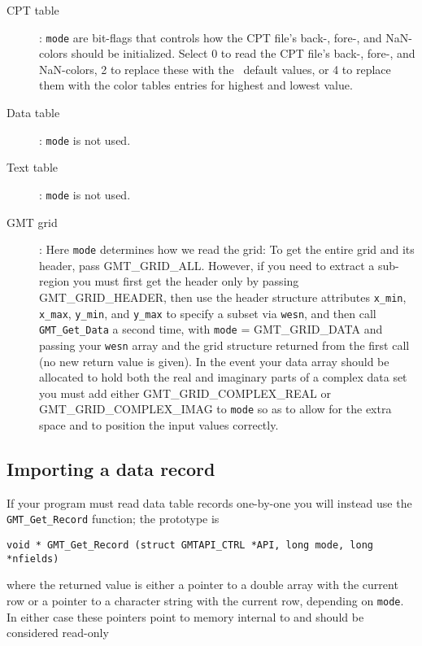 \documentclass{report}
\begin{document}
\begin{description}
\item [CPT table]:  \texttt{mode} are bit-flags that controls how the CPT file's back-, fore-, and NaN-colors
should be initialized.  Select 0 to read the CPT file's back-, fore-, and NaN-colors, 2
to replace these with the \GMT\ default values, or 4 to replace them with the color tables
entries for highest and lowest value.
\item [Data table]:  \texttt{mode} is not used.
\item [Text table]:  \texttt{mode} is not used.
\item [GMT grid]:  Here \texttt{mode} determines how we read the grid:
To get the entire grid and its header, pass GMT\_GRID\_ALL.  However, if you
need to extract a sub-region you must first get the header only by passing
GMT\_GRID\_HEADER, then use the header structure attributes \texttt{x\_min},
\texttt{x\_max}, \texttt{y\_min}, and \texttt{y\_max} to specify a subset via \texttt{wesn}, and then call
\texttt{GMT\_Get\_Data} a second time, with \texttt{mode} = GMT\_GRID\_DATA and passing your \texttt{wesn} array
and the grid structure returned from the first call (no new return value is given).
In the event your data array should be allocated to hold both the real and imaginary parts of a
complex data set you must add either GMT\_GRID\_COMPLEX\_REAL or GMT\_GRID\_COMPLEX\_IMAG to \texttt{mode}
so as to allow for the extra space and to position the input values correctly.
\end{description}

\subsection{Importing a data record}

If your program must read data table records one-by-one you will instead use the
\texttt{GMT\_Get\_Record} function; the prototype is

\begin{verbatim}
void * GMT_Get_Record (struct GMTAPI_CTRL *API, long mode, long *nfields)
\end{verbatim}
where the returned value is either a pointer to a double array with the current row
or a pointer to a character string with the current row, depending on \texttt{mode}.
In either case these pointers point to memory internal to \GMT and should be considered read-only
\end{document}
